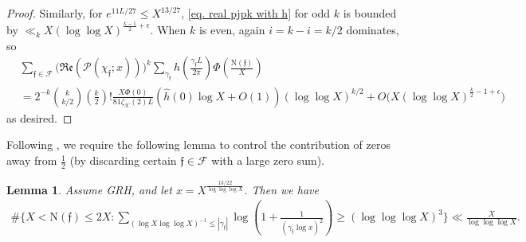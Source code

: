 \documentclass[11pt]{amsart}
\newcommand{\norm}{\mathrm{N}}
\newtheorem{lemma}[prop]{Lemma}
\numberwithin{equation}{section}
\renewcommand{\Re}{{\mathfrak{Re}}}
\theoremstyle{remark}
\begin{document}
\begin{proof}
Similarly, for $e^{11L/27}\le X^{13/27}$, \eqref{eq. real pjpk with h} for odd $k$ is bounded by
$\ll_k X(\log \log X)^{\frac{k-1}{2}+\epsilon}$. When $k$ is even, again $i=k-i=k/2$ dominates, so
\begin{align*}
    &\sum_{\mathfrak{f}\in\mathcal{F}}\big(\Re(\mathcal{P}(\chi_\mathfrak{f}; x))\big)^{k}\sum_{\gamma_{\mathfrak{f}}} h\left( \frac{\gamma_{\mathfrak{f}} L}{2\pi}\right)\Phi\left(\frac{\norm(\mathfrak{f})}{X}\right)\\
    &=
    2^{-k} {k\choose k/2} {\left(\frac{k}{2}\right)!}
    \frac{X\widehat{\Phi}(0)}{81\zeta_\mathcal{K}(2)L}     
    \left(\hat{h}(0) \log X + O(1)\right) 
    (\log \log X)^{k/2} + O\big( X(\log \log X)^{\frac{k}{2}-1+\epsilon}\big)
\end{align*}
as desired.
\end{proof}

Following \cite{RaSo}, we require the following lemma to control the contribution of zeros away from $\frac{1}{2}$ (by discarding certain $\mathfrak{f}\in \mathcal{F}$ with a large zero sum).


\begin{lemma}\label{RS-lemma2}
   Assume GRH, and let $x=X^{\frac{13/22}{\log \log\log X}}$.
    Then we have
    \begin{align*}
        \# \Big\{ X< \norm(\mathfrak{f})\le 2X: \sum_{(\log X\log \log X)^{-1}\le |\gamma_\mathfrak{f}|}
        \log\left( 1+\frac{1}{(\gamma_\mathfrak{f} \log x)^2} \right)
        \ge
        (\log \log \log X)^3 \Big\}
        \ll
        \frac{X}{\log \log \log X}.
    \end{align*}
\end{lemma} 
\end{document}
